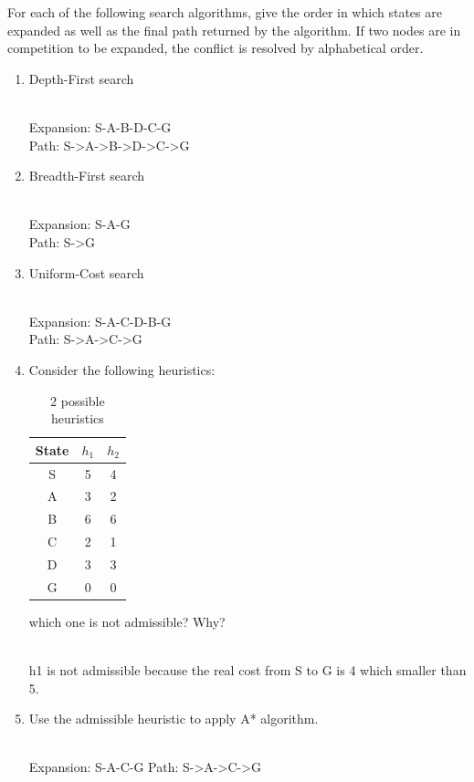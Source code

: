 \documentclass[9pt,a4paper]{extarticle}
\newenvironment{solution}
    {%
    \color{red}
    }
    { 
    \color{black}
    }
\begin{document}
For each of the following search algorithms, give the order in which states are expanded as well as the final path returned by the algorithm. If two nodes are in competition to be expanded, the conflict is resolved by alphabetical order.
\begin{enumerate}
    \item Depth-First search
    \begin{solution}
    \\
    Expansion: S-A-B-D-C-G\\
    Path: S->A->B->D->C->G
    \end{solution}
    \item Breadth-First search
    \begin{solution}
    \\
    Expansion: S-A-G\\
    Path: S->G
    \end{solution}
    \item Uniform-Cost search
    \begin{solution}
    \\
    Expansion: S-A-C-D-B-G\\
    Path: S->A->C->G
    \end{solution}
    \item Consider the following heuristics:
    \begin{table}[h]
        \centering
        \begin{tabular}{|c|c|c|}
        \hline
            State & $h_1$ & $h_2$ \\ \hline
            S & 5 & 4\\ \hline
            A & 3 & 2\\ \hline
            B & 6 & 6\\ \hline
            C & 2 & 1\\ \hline
            D & 3 & 3\\ \hline
            G & 0 & 0\\ \hline
        \end{tabular}
        \caption{2 possible heuristics}
        \label{tab:my_label}
    \end{table}
    which one is not admissible? Why?
    \begin{solution}
    \\
    h1 is not admissible because the real cost from S to G is 4 which smaller than 5.
    \end{solution}
    \item Use the admissible heuristic to apply A* algorithm.
    \begin{solution}
    \\
    Expansion: S-A-C-G
    Path: S->A->C->G
    \end{solution}
\end{enumerate}
\end{document}

